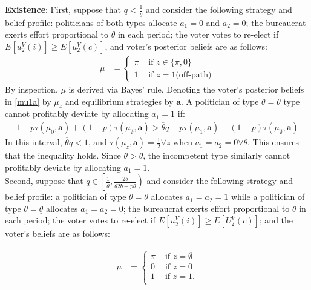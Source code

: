 \documentclass[11pt,english]{article}
\begin{document}
\textbf{Existence}: First, suppose that $q < \frac{1}{\overline{\theta}}$ and consider the following strategy and belief profile: politicians of both types allocate $a_1 = 0$ and $a_2 = 0$; the bureaucrat exerts effort proportional to $\theta$ in each period; the voter votes to re-elect if $E[u_2^V(i)] \geq E[u_2^V(c)]$, and voter's posterior beliefs are as follows:
\begin{align}\label{mu1a}
\mu &= \begin{cases}
\pi & \text{ if } z \in \{\pi, 0\}\\
1 & \text{ if }z = 1 \text{(off-path)}
\end{cases}
\end{align}
By inspection, $\mu$ is derived via Bayes' rule. Denoting the voter's posterior beliefs in \eqref{mu1a} by $\mu_z$ and equilibrium strategies by $\boldsymbol{a}$. A politician of type $\theta = \overline{\theta}$ type cannot profitably deviate by allocating $a_1 = 1$ if:
\begin{align*}
1 + p\tau(\mu_0, \boldsymbol{a}) + (1-p)\tau(\mu_\emptyset, \boldsymbol{a}) > \overline{\theta}q + p\tau(\mu_1, \boldsymbol{a}) + (1-p)\tau(\mu_\emptyset, \boldsymbol{a})
\end{align*}
In this interval, $\overline{\theta}q < 1$, and $\tau(\mu_z, \boldsymbol{a}) = \frac{1}{2} \forall z$ when $a_1= a_2 = 0 \forall \theta$. This ensures that the inequality holds. Since $\overline{\theta} > \underline{\theta}$, the incompetent type similarly cannot profitably deviate by allocating $a_1 = 1$.\\



Second, suppose that $q \in \left[\frac{1}{\overline{\theta}}, \frac{2b}{\underline{\theta}2b + p\overline{\theta}}\right)$ and consider the following strategy and belief profile: a politician of type $\theta = \overline{\theta}$ allocates $a_1 = a_2 = 1$ while a politician of type $\theta = \underline{\theta}$ allocates $a_1 = a_2 = 0$;  the bureaucrat exerts effort proportional to $\theta$ in each period; the voter votes to re-elect if $E[u_2^V(i)] \geq E[U_2^V(c)]$; and the voter's beliefs are as follows:

\begin{align}\label{mu2a}
\mu&= \begin{cases}
\pi & \text{ if } z = \emptyset\\
0 & \text{ if } z = 0 \\
1 & \text{ if }z = 1.\\
\end{cases}
\end{align}
\end{document}
